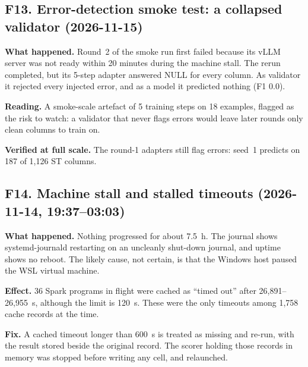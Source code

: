 \subsection{F13. Error-detection smoke test: a collapsed validator (2026-11-15)}
\begin{failbox}{}
\textbf{What happened.} Round~2 of the smoke run first failed because its vLLM server was not ready within 20 minutes
during the machine stall. The rerun completed, but its 5-step adapter answered NULL for every column. As validator it
rejected every injected error, and as a model it predicted nothing (F1 0.0).

\textbf{Reading.} A smoke-scale artefact of 5 training steps on 18 examples, flagged as the risk to watch: a validator
that never flags errors would leave later rounds only clean columns to train on.

\textbf{Verified at full scale.} The round-1 adapters still flag errors: seed~1 predicts on 187 of 1,126 ST columns.
\end{failbox}

\subsection{F14. Machine stall and stalled timeouts (2026-11-14, 19:37--03:03)}
\begin{failbox}{}
\textbf{What happened.} Nothing progressed for about 7.5~h. The journal shows systemd-journald restarting on an
uncleanly shut-down journal, and uptime shows no reboot. The likely cause, not certain, is that the Windows host paused
the WSL virtual machine.

\textbf{Effect.} 36 Spark programs in flight were cached as ``timed out'' after 26,891--26,955~s, although the limit is
120~s. These were the only timeouts among 1,758 cache records at the time.

\textbf{Fix.} A cached timeout longer than 600~s is treated as missing and re-run, with the result stored beside the
original record. The scorer holding those records in memory was stopped before writing any cell, and relaunched.
\end{failbox}

